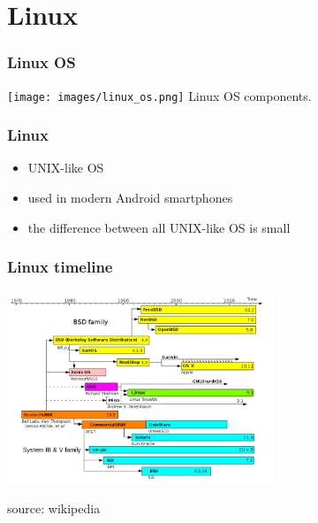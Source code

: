 %

\section{Linux}

\begin{frame}
	\frametitle{Linux OS}
	
        \begin{center}
        \texttt{[image: images/linux\_os.png]}
        {\small Linux OS components.}
        \end{center}
\end{frame}

\begin{frame}
	\frametitle{Linux }
	\begin{itemize}
		\item	UNIX-like OS 
		\item	used in modern Android smartphones
		\item   the difference between all UNIX-like OS is small	
	\end{itemize}
	
\end{frame}

\begin{frame}
	\frametitle{Linux timeline}
        \begin{center}
        \includegraphics[width=8.0cm]{images/Unix_timeline.png}
        \end{center}
        {\tiny source: wikipedia}
\end{frame}

